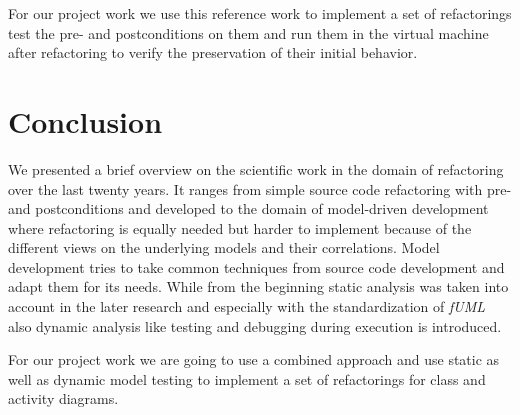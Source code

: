 \documentclass{llncs}
\begin{document}
For our project work we use this reference work to implement a set of refactorings test the pre- and postconditions on them and run them in the virtual machine after refactoring to verify the preservation of their initial behavior.

\section{Conclusion}
\label{sec:conclusion}

We presented a brief overview on the scientific work in the domain of refactoring over the last twenty years. It ranges from simple source code refactoring with pre- and postconditions and developed to the domain of model-driven development where refactoring is equally needed but harder to implement because of the different views on the underlying models and their correlations. Model development tries to take common techniques from source code development and adapt them for its needs. While from the beginning static analysis was taken into account in the later research and especially with the standardization of \textit{fUML} also dynamic analysis like testing and debugging during execution is introduced.

For our project work we are going to use a combined approach and use static as well as dynamic model testing to implement a set of refactorings for class and activity diagrams.

\newpage


\end{document}
